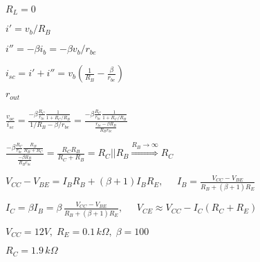 \documentclass{article}
\def\lthtmlcheckvsize{\ifdim\ht\sizebox<\vsize 
  \ifdim\wd\sizebox<\hsize\expandafter\hfill\fi \expandafter\vfill
  \else\expandafter\vss\fi}%
\begin{document}
{\newpage\clearpage
{}%
$ R_L=0$%
\lthtmlindisplaymathZ
\lthtmlcheckvsize\clearpage}

{\newpage\clearpage
{}%
$ i'=v_b/R_B$%
\lthtmlindisplaymathZ
\lthtmlcheckvsize\clearpage}

{\newpage\clearpage
{}%
$ i''=-\beta i_b=-\beta v_b/r_{be}$%
\lthtmlindisplaymathZ
\lthtmlcheckvsize\clearpage}

{\newpage\clearpage
{}%
$\displaystyle i_{sc}=i'+i''=v_b\left(\frac{1}{R_B}-\frac{\beta}{r_{be}}\right)$%
\lthtmlindisplaymathZ
\lthtmlcheckvsize\clearpage}

{\newpage\clearpage
{}%
$\displaystyle r_{out}$%
\lthtmlindisplaymathZ
\lthtmlcheckvsize\clearpage}

{\newpage\clearpage
{}%
$\displaystyle \frac{v_{oc}}{i_{sc}}=\frac{-\beta\frac{R_C}{r_{be}}\frac{1}{1+R_C/R_B}}
{1/R_B-\beta/r_{be}}
=\frac{-\beta\frac{R_C}{r_{be}}\frac{1}{1+R_C/R_B}}{\frac{r_{be}-\beta R_B}{R_B r_{be}}}$%
\lthtmlindisplaymathZ
\lthtmlcheckvsize\clearpage}

{\newpage\clearpage
{}%
$\displaystyle \frac{-\beta\frac{R_C}{r_{be}}\frac{R_B}{R_B+R_C}}{\frac{-\beta R_B}{R_B r_{be}}}
=\frac{R_C R_B}{R_C+R_B}=R_C||R_B\stackrel{R_B\rightarrow\infty}{\Longrightarrow}R_C$%
\lthtmlindisplaymathZ
\lthtmlcheckvsize\clearpage}

{\newpage\clearpage
{}%
$\displaystyle V_{CC}-V_{BE}=I_B R_B+(\beta+1)I_BR_E,\;\;\;\;\;
I_B=\frac{V_{CC}-V_{BE}}{R_B+(\beta+1)R_E}$%
\lthtmlindisplaymathZ
\lthtmlcheckvsize\clearpage}

{\newpage\clearpage
{}%
$\displaystyle I_C=\beta I_B=\beta\,\frac{V_{CC}-V_{BE}}{R_B+(\beta+1)R_E},\;\;\;\;\;
V_{CE}\approx V_{CC}-I_C(R_C+R_E)$%
\lthtmlindisplaymathZ
\lthtmlcheckvsize\clearpage}

{\newpage\clearpage
{}%
$ V_{CC}=12V,\;R_E=0.1\,k\Omega,\;\beta=100$%
\lthtmlindisplaymathZ
\lthtmlcheckvsize\clearpage}

{\newpage\clearpage
{}%
$ R_C=1.9\,k\Omega$%
\lthtmlindisplaymathZ
\lthtmlcheckvsize\clearpage}
\end{document}
